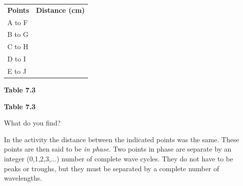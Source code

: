           \begin{table}[H]
        \begin{center}
      \label{m38806*id318927}
    \noindent
      \tablelasttail{}
      \begin{xtabular}[t]{|l|l|}\hline
                  \textbf{Points}
                 &
                  \textbf{Distance (cm)}
     \tabularnewline{}
        A to F &
     \tabularnewline{}
        B to G &
     \tabularnewline{}
        C to H &
     \tabularnewline{}
        D to I &
     \tabularnewline{}
        E to J &
     \tabularnewline{}
    \end{xtabular}
      \end{center}
    \begin{center}{\small\bfseries Table 7.3}\end{center}
    \begin{caption}{\small\bfseries Table 7.3}\end{caption}
\end{table}
    \par
        \label{m38806*id319062}What do you find? \par 
        \label{m38806*id319071}In the activity the distance between the indicated points was the same. These points are then said to be \textsl{in phase}. Two points in phase are separate by an integer (0,1,2,3,...) number of complete wave cycles. They do not have to be peaks or troughs, but they must be separated by a complete number of wavelengths.\par 
